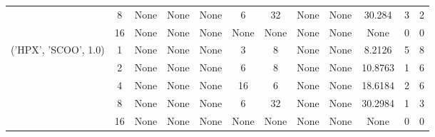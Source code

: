 \begin{tabular}{cccccccccccc}
& 8& None& None& None& 6& 32& None& None& 30.284& 3& 2\\
& 16& None& None& None& None& None& None& None& None& 0& 0\\
\hline
\multirow{5}{*}{('HPX', 'SCOO', 1.0)}& 1& None& None& None& 3& 8& None& None& 8.2126& 5& 8\\
& 2& None& None& None& 6& 8& None& None& 10.8763& 1& 6\\
& 4& None& None& None& 16& 6& None& None& 18.6184& 2& 6\\
& 8& None& None& None& 6& 32& None& None& 30.2984& 1& 3\\
& 16& None& None& None& None& None& None& None& None& 0& 0\\
\hline
\end{tabular}

